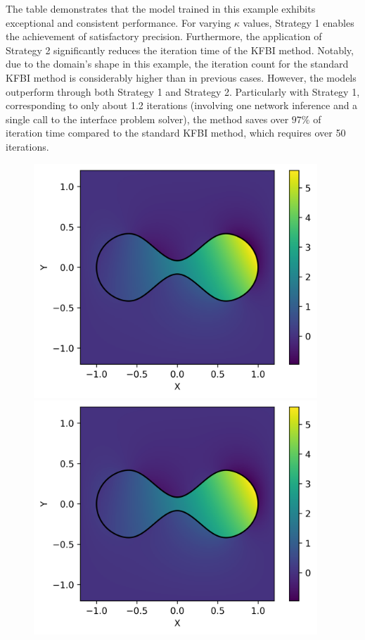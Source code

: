 \documentclass{article}
\begin{document}
The table demonstrates that the model trained in this example exhibits exceptional and consistent performance. For varying $\kappa$ values, Strategy 1 enables the achievement of satisfactory precision. Furthermore, the application of Strategy 2 significantly reduces the iteration time of the KFBI method. Notably, due to the domain's shape in this example, the iteration count for the standard KFBI method is considerably higher than in previous cases. However, the models outperform through both Strategy 1 and Strategy 2. Particularly with Strategy 1, corresponding to only about 1.2 iterations (involving one network inference and a single call to the interface problem solver), the method saves over $97\%$ of iteration time compared to the standard KFBI method, which requires over 50 iterations.
\begin{figure}[htb]
\centering
\begin{minipage}[t]{0.48\textwidth}
\centering
\includegraphics[width=0.95\textwidth]{new1.png}
\end{minipage}
\begin{minipage}[t]{0.48\textwidth}
\centering
\includegraphics[width=0.95\textwidth]{new2.png}

\end{minipage}
\end{figure}
\end{document}
